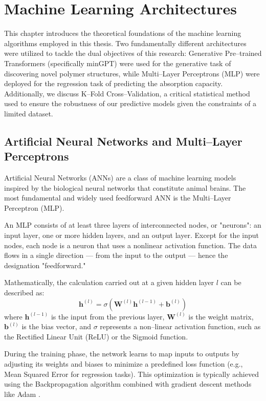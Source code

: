 \chapter{Machine Learning Architectures}

This chapter introduces the theoretical foundations of the machine learning algorithms employed in this thesis. Two fundamentally different architectures were utilized to tackle the dual objectives of this research: Generative Pre--trained Transformers (specifically minGPT) were used for the generative task of discovering novel polymer structures, while Multi--Layer Perceptrons (MLP) were deployed for the regression task of predicting the absorption capacity. Additionally, we discuss K--Fold Cross--Validation, a critical statistical method used to ensure the robustness of our predictive models given the constraints of a limited dataset.

\section{Artificial Neural Networks and Multi--Layer Perceptrons}
\label{sec:mlp}

Artificial Neural Networks (ANNs) are a class of machine learning models inspired by the biological neural networks that constitute animal brains. The most fundamental and widely used feedforward ANN is the Multi--Layer Perceptron (MLP).

An MLP consists of at least three layers of interconnected nodes, or "neurons": an input layer, one or more hidden layers, and an output layer.  Except for the input nodes, each node is a neuron that uses a nonlinear activation function. The data flows in a single direction — from the input to the output — hence the designation "feedforward."

Mathematically, the calculation carried out at a given hidden layer $l$ can be described as:
\begin{equation}
	\mathbf{h}^{(l)} = \sigma \left( \mathbf{W}^{(l)} \mathbf{h}^{(l-1)} + \mathbf{b}^{(l)} \right)
\end{equation}
where $\mathbf{h}^{(l-1)}$ is the input from the previous layer, $\mathbf{W}^{(l)}$ is the weight matrix, $\mathbf{b}^{(l)}$ is the bias vector, and $\sigma$ represents a non--linear activation function, such as the Rectified Linear Unit (ReLU) or the Sigmoid function.

During the training phase, the network learns to map inputs to outputs by adjusting its weights and biases to minimize a predefined loss function (e.g., Mean Squared Error for regression tasks). This optimization is typically achieved using the Backpropagation algorithm combined with gradient descent methods like Adam \cite{kingma2014adam}.

